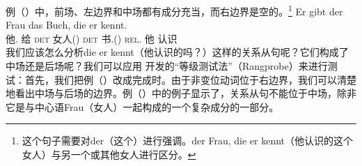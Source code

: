 例（）中，前场、左边界和中场都有成分充当，而右边界是空的。\footnote{%
这个句子需要对der（这个）进行强调。der Frau, die er kennt（他认识的这个女人）与另一个或其他女人进行区分。}
\ea
\gll Er        gibt  der         Frau      das           Buch,    die er kennt.\\
     他.\mas{} 给    \textsc{det} 女人(\fem) \textsc{det} 书.(\neu) \textsc{rel}.\fem{} 他 认识\\
\z 
我们应该怎么分析die er
kennt（他认识的吗？）这样的关系从句呢？它们构成了中场还是后场呢？我们可以应用 \citet[]{Bech55a}开发的“等级测试法”（Rangprobe）来进行测试：首先，我们把例（）改成完成时。由于非变位动词位于右边界，我们可以清楚地看出中场与后场的边界。例（）中的例子显示了，关系从句不能位于中场，除非它是与中心语Frau（女人）一起构成的一个复杂成分的一部分。
\eal
{}
\zl

